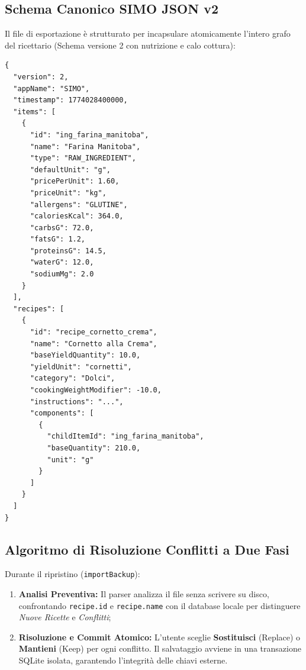 \documentclass[11pt,a4paper,titlepage]{article}
\begin{document}
\subsection{Schema Canonico SIMO JSON v2}
Il file di esportazione \`e strutturato per incapsulare atomicamente l'intero grafo del ricettario (Schema versione 2 con nutrizione e calo cottura):
\begin{lstlisting}[caption={Schema JSON canonico di backup Versione 2}]
{
  "version": 2,
  "appName": "SIMO",
  "timestamp": 1774028400000,
  "items": [
    {
      "id": "ing_farina_manitoba",
      "name": "Farina Manitoba",
      "type": "RAW_INGREDIENT",
      "defaultUnit": "g",
      "pricePerUnit": 1.60,
      "priceUnit": "kg",
      "allergens": "GLUTINE",
      "caloriesKcal": 364.0,
      "carbsG": 72.0,
      "fatsG": 1.2,
      "proteinsG": 14.5,
      "waterG": 12.0,
      "sodiumMg": 2.0
    }
  ],
  "recipes": [
    {
      "id": "recipe_cornetto_crema",
      "name": "Cornetto alla Crema",
      "baseYieldQuantity": 10.0,
      "yieldUnit": "cornetti",
      "category": "Dolci",
      "cookingWeightModifier": -10.0,
      "instructions": "...",
      "components": [
        {
          "childItemId": "ing_farina_manitoba",
          "baseQuantity": 210.0,
          "unit": "g"
        }
      ]
    }
  ]
}
\end{lstlisting}

\subsection{Algoritmo di Risoluzione Conflitti a Due Fasi}
Durante il ripristino (\texttt{importBackup}):
\begin{enumerate}
	\item \textbf{Analisi Preventiva:} Il parser analizza il file senza scrivere su disco, confrontando \texttt{recipe.id} e \texttt{recipe.name} con il database locale per distinguere \textit{Nuove Ricette} e \textit{Conflitti};
	\item \textbf{Risoluzione e Commit Atomico:} L'utente sceglie \textbf{Sostituisci} (Replace) o \textbf{Mantieni} (Keep) per ogni conflitto. Il salvataggio avviene in una transazione SQLite isolata, garantendo l'integrit\`a delle chiavi esterne.
\end{enumerate}


\newpage

\end{document}
